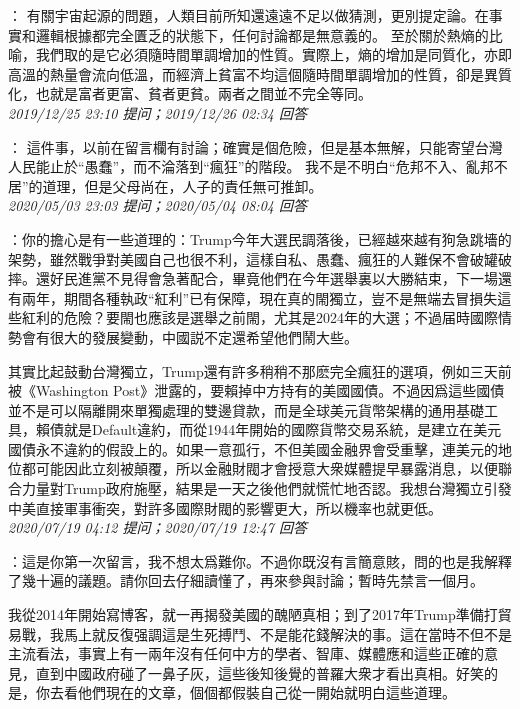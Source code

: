 \documentclass[twocolumn]{ctexart}
\begin{document}
：
有關宇宙起源的問題，人類目前所知還遠遠不足以做猜測，更別提定論。在事實和邏輯根據都完全匱乏的狀態下，任何討論都是無意義的。
至於關於熱熵的比喻，我們取的是它必須隨時間單調增加的性質。實際上，熵的增加是同質化，亦即高溫的熱量會流向低溫，而經濟上貧富不均這個隨時間單調增加的性質，卻是異質化，也就是富者更富、貧者更貧。兩者之間並不完全等同。
\\

\textit{\hfill\noindent\small 2019/12/25 23:10 提问；2019/12/26 02:34 回答}

：
這件事，以前在留言欄有討論；確實是個危險，但是基本無解，只能寄望台灣人民能止於“愚蠢”，而不淪落到“瘋狂”的階段。
我不是不明白“危邦不入、亂邦不居”的道理，但是父母尚在，人子的責任無可推卸。
\\

\textit{\hfill\noindent\small 2020/05/03 23:03 提问；2020/05/04 08:04 回答}

：你的擔心是有一些道理的：Trump今年大選民調落後，已經越來越有狗急跳墻的架勢，雖然戰爭對美國自己也很不利，這樣自私、愚蠢、瘋狂的人難保不會破罐破摔。還好民進黨不見得會急著配合，畢竟他們在今年選舉裏以大勝結束，下一場還有兩年，期間各種執政“紅利”已有保障，現在真的閙獨立，豈不是無端去冒損失這些紅利的危險？要閙也應該是選舉之前閙，尤其是2024年的大選；不過届時國際情勢會有很大的發展變動，中國説不定還希望他們鬧大些。

其實比起鼓動台灣獨立，Trump還有許多稍稍不那麽完全瘋狂的選項，例如三天前被《Washington Post》泄露的，要賴掉中方持有的美國國債。不過因爲這些國債並不是可以隔離開來單獨處理的雙邊貸款，而是全球美元貨幣架構的通用基礎工具，賴債就是Default違約，而從1944年開始的國際貨幣交易系統，是建立在美元國債永不違約的假設上的。如果一意孤行，不但美國金融界會受重擊，連美元的地位都可能因此立刻被顛覆，所以金融財閥才會授意大衆媒體提早暴露消息，以便聯合力量對Trump政府施壓，結果是一天之後他們就慌忙地否認。我想台灣獨立引發中美直接軍事衝突，對許多國際財閥的影響更大，所以機率也就更低。
\\

\textit{\hfill\noindent\small 2020/07/19 04:12 提问；2020/07/19 12:47 回答}

：這是你第一次留言，我不想太爲難你。不過你既沒有言簡意賅，問的也是我解釋了幾十遍的議題。請你回去仔細讀懂了，再來參與討論；暫時先禁言一個月。

我從2014年開始寫博客，就一再揭發美國的醜陋真相；到了2017年Trump準備打貿易戰，我馬上就反復强調這是生死搏鬥、不是能花錢解決的事。這在當時不但不是主流看法，事實上有一兩年沒有任何中方的學者、智庫、媒體應和這些正確的意見，直到中國政府碰了一鼻子灰，這些後知後覺的普羅大衆才看出真相。好笑的是，你去看他們現在的文章，個個都假裝自己從一開始就明白這些道理。
\end{document}
